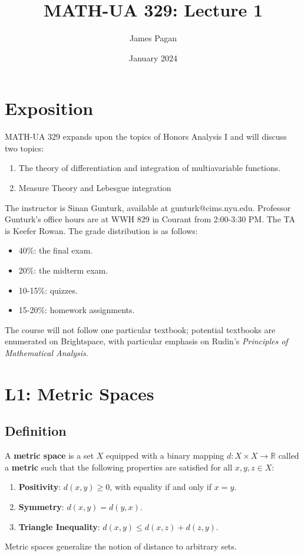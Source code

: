 \documentclass[11pt]{article}
\title{MATH-UA 329: Lecture 1}
\author{James Pagan}
\date{January 2024}
\begin{document}
\maketitle
\tableofcontents
\newpage


\section{Exposition}

MATH-UA 329 expands upon the topics of Honors Analysis I and will discuss two topics:
\begin{enumerate}
	\item The theory of differentiation and integration of multiavariable functions.
	\item Measure Theory and Lebesgue integration
\end{enumerate}
The instructor is Sinan Gunturk, available at gunturk@cims.nyu.edu. Professor Gunturk's office hours are at WWH 829 in Courant from 2:00-3:30 PM. The TA is Keefer Rowan. The grade distribution is as follows:
\begin{itemize}
	\item 40\%: the final exam.
	\item 20\%: the midterm exam.
	\item 10-15\%: quizzes.
	\item 15-20\%: homework assignments.
\end{itemize}
The course will not follow one particular textbook; potential textbooks are enumerated on Brightspace, with particular emphasis on Rudin's \textit{Principles of Mathematical Analysis}.


\section{L1: Metric Spaces}


\subsection{Definition}

A \textbf{metric space} is a set $X$ equipped with a binary mapping $d : X \times X \to \mathbb{R}$ called a \textbf{metric} such that the following properties are satisfied for all $x, y, z \in X$:
\begin{enumerate}
	\item \textbf{Positivity}: $d(x, y) \ge 0$, with equality if and only if $x = y$.
	\item \textbf{Symmetry}: $d(x, y) = d(y, x)$.
	\item \textbf{Triangle Inequality}: $d(x, y) \le d(x, z) + d(z, y)$.
\end{enumerate}
Metric spaces generalize the notion of distance to arbitrary sets. 
\end{document}
